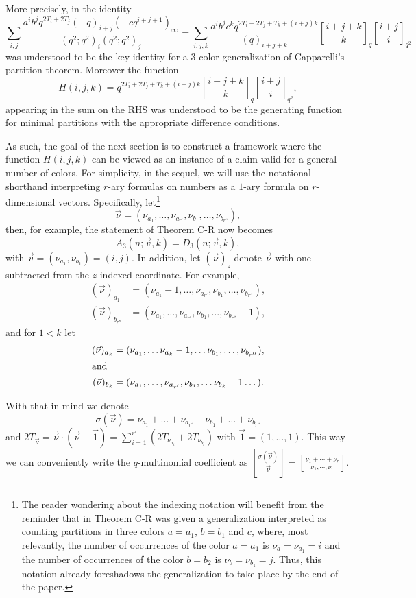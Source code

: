 \documentclass[12pt,a4paper]{amsart}
\theoremstyle{definition}
\theoremstyle{notation}
\theoremstyle{corollary}
\begin{document}
More precisely, in \cite{KAGEABG95} the identity
\[\sum_{i,j}\frac{a^ib^jq^{2T_i+2T_j}(-q)_{i+j}(-cq^{i+j+1})_{\infty}}{(q^2;q^2)_i(q^2;q^2)_j}
=\sum_{i,j,k}\frac{a^ib^jc^kq^{2T_i+2T_j+T_k+(i+j)k}}{(q)_{i+j+k}}{{i+j+k} \brack k}_q{{i+j} \brack i}_{q^2}\]
was understood to be the key identity for a 3-color generalization of Capparelli's partition theorem. Moreover the function 
\[H(i,j,k)=q^{2T_i+2T_j+T_k+(i+j)k}{{i+j+k} \brack k}_q{{i+j} \brack i}_{q^2},\]
appearing in the sum on the RHS was understood to be the generating function for minimal partitions with the appropriate difference conditions.

As such, the goal of the next section is to construct a framework where the function $H(i,j,k)$ can be viewed as an instance of a claim valid for a general number of colors. For simplicity, in the sequel, we will use the notational shorthand interpreting $r$-ary formulas on numbers as a $1$-ary formula on $ r$-dimensional vectors. Specifically, let\footnote{The reader wondering about the indexing notation will benefit from the reminder that in \cite{KAGEABG95} Theorem C-R was given a generalization interpreted as counting partitions in three colors $a=a_1$, $b=b_1$ and $c$, where, most relevantly, the number of occurrences of the color $a=a_1$ is $\nu_a=\nu_{a_1}=i$ and the number of occurrences of the color $b=b_2$ is $\nu_b=\nu_{b_1}=j$. Thus, this notation already foreshadows the generalization to take place by the end of the paper.} 
\[\vec{\nu}=(\nu_{a_1},\dots,\nu_{a_{r'}},\nu_{b_1},\dots,\nu_{b_{r''}}),\] then, for example, the statement of Theorem C-R now becomes \[A_3(n;\vec{v},k)=D_3(n;\vec{v},k),\]
with $\vec{v}=(\nu_{a_1},\nu_{b_1})=(i,j)$.
In addition, let $(\vec{\nu})_{z}$ denote $\vec{\nu}$ with one subtracted from the $z$ indexed coordinate. For example,
\begin{align*}
    (\vec{\nu})_{a_1}&=(\nu_{a_1}-1,\dots,\nu_{a_{r'}},\nu_{b_1},\dots,\nu_{b_{r''}}),\\
    (\vec{\nu})_{b_{r''}}&=(\nu_{a_1},\dots,\nu_{a_{r'}},\nu_{b_1},\dots,\nu_{b_{r''}}-1),
\end{align*}
and for $1<k$ let
\begin{align*}
    (\vec{\nu})_{a_k}&=(\nu_{a_1},\dots\nu_{a_{k}}-1,\dots\nu_{b_1},\dots,\nu_{b_{r''}}),\\
    \intertext{and}
    (\vec{\nu})_{b_k}&=(\nu_{a_1},\dots,\nu_{a_{r'}},\nu_{b_{1}},\dots\nu_{b_k}-1\dots).
\end{align*}

With that in mind we denote \[\sigma(\vec{\nu})=\nu_{a_1}+\dots+\nu_{a_{r'}}+\nu_{b_1}+\dots+\nu_{b_{r''}}\] and 
$2T_{\vec{\nu}}=\vec{\nu}\cdot (\vec{\nu}+\vec{1})=\sum_{i=1}^{r'}(2T_{\nu_{a_i}}+2T_{\nu_{b_i}})$ with $\vec{1}=(1,\dots,1)$. This way we can conveniently write the $q$-multinomial coefficient as  \({\sigma(\vec{\nu})\brack\vec{\nu}}={{\nu_1+\cdots+\nu_r}\brack {\nu_1, \cdots, \nu_r}}.\)
\end{document}
